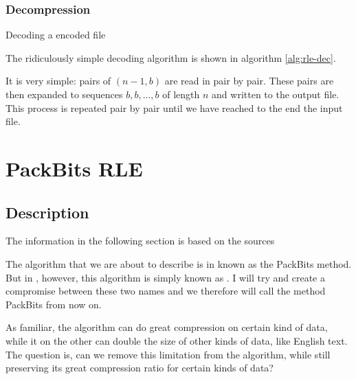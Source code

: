 \subsubsection{Decompression}

\begin{algorithm}
  \caption{Decoding a \rle encoded file}
  \label{alg:rle-dec}
  \begin{algorithmic}[1]


    \While{\neof}
    \State {}
    \EndRepeatn


    \EndWhile
  \end{algorithmic}
\end{algorithm}

The ridiculously simple \rle decoding algorithm is shown in algorithm
\ref{alg:rle-dec}.

It is very simple: pairs of $(n-1,b)$ are read in pair by pair. These
pairs are then expanded to sequences $b,b,\dots,b$ of length $n$ and
written to the output file. This process is repeated pair by pair
until we have reached to the end the input file.

\section{PackBits RLE}
\label{sec:packbits-rle}

\subsection{Description}

The information in the following section is based on the sources
\cite{96:_techn_note_tn102,apple1994inside,91:_truev_tga_file_format_specif}

The algorithm that we are about to describe is in
\cite{96:_techn_note_tn102,apple1994inside} known as the PackBits
method. But in \cite{91:_truev_tga_file_format_specif}, however, this
algorithm is simply known as \rle. I will try and create a compromise
between these two names and we therefore will call the method PackBits
\rle from now on.

As familiar, the \rle algorithm can do great compression on certain
kind of data, while it on the other can double the size of other kinds
of data, like English text. The question is, can we remove this
limitation from the algorithm, while still preserving its great
compression ratio for certain kinds of data?

